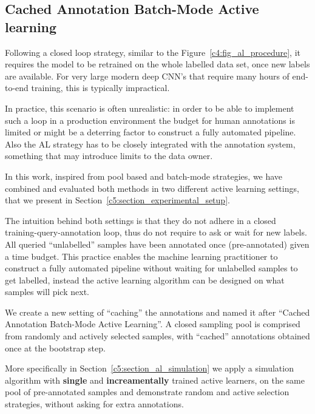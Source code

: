 \subsection{Cached Annotation Batch-Mode Active learning}
\label{c5:section_cached_setting}

Following a closed loop strategy, similar to the Figure~\ref{c4:fig_al_procedure}, it requires the model to be retrained on the whole labelled data set, once new labels are available. For very large modern deep CNN's that require many hours of end-to-end training, this is typically impractical.

In practice, this scenario is often unrealistic: in order to be able to implement such a loop in a production environment the budget for human annotations is limited or might be a deterring factor to construct a fully automated pipeline.
Also the AL strategy has to be closely integrated with the annotation system, something that may introduce limits to the data owner.

In this work, inspired from pool based and batch-mode strategies, we have combined and evaluated both methods in two different active learning settings, that we present in Section~\ref{c5:section_experimental_setup}.

The intuition behind both settings is that they do not adhere in a closed training-query-annotation loop, thus do not require to ask or wait for new labels. All queried ``unlabelled'' samples have been annotated once (pre-annotated) given a time budget. This practice enables the machine learning practitioner to construct a fully automated pipeline without waiting for unlabelled samples to get labelled, instead the active learning algorithm can be designed on what samples will pick next.

We create a new setting of ``caching'' the annotations and named it after ``Cached Annotation Batch-Mode Active Learning''. 
A closed sampling pool is comprised from randomly and actively selected samples, with ``cached'' annotations obtained once at the bootstrap step.

More specifically in Section~\ref{c5:section_al_simulation} we apply a simulation algorithm with \textbf{single} and \textbf{increamentally} trained active learners, on the same pool of pre-annotated samples and demonstrate random and active selection strategies, without asking for extra annotations.
